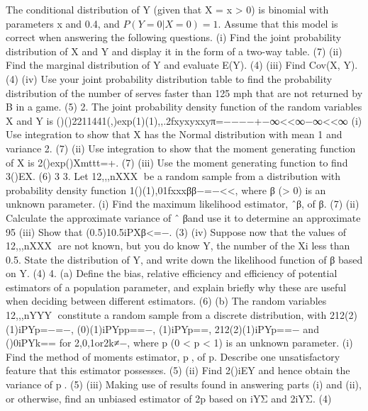 The conditional distribution of Y (given that X = x > 0) is binomial with parameters x and 0.4, and $P(Y = 0 | X = 0) = 1$. 
Assume that this model is correct when answering the following questions. (i) Find the joint probability distribution of X and Y and display it in the form of a two-way table. (7) (ii) Find the marginal distribution of Y and evaluate E(Y). (4) (iii) Find Cov(X, Y). (4) (iv) Use your joint probability distribution table to find the probability distribution of the number of serves faster than 125 mph that are not returned by B in a game. (5) 2. The joint probability density function of the random variables X and Y is ()()2211441(,)exp(1)(1),,.2fxyxyxxyπ=−−−−+−∞<<∞−∞<<∞ (i) Use integration to show that X has the Normal distribution with mean 1 and variance 2. (7) (ii) Use integration to show that the moment generating function of X is 2()exp()Xmttt=+. (7) (iii) Use the moment generating function to find 3()EX. (6)
3
3. Let 12,,,nXXX be a random sample from a distribution with probability density function 1()(1),01fxxxββ−=−<<, where β (> 0) is an unknown parameter. (i) Find the maximum likelihood estimator, ˆβ, of β. (7) (ii) Calculate the approximate variance of ˆ
βand use it to determine an approximate 95%
(iii) Show that (0.5)10.5iPXβ<=−. (3) (iv) Suppose now that the values of 12,,,nXXX are not known, but you do know Y, the number of the Xi less than 0.5. State the distribution of Y, and write down the likelihood function of β based on Y. (4) 4. (a) Define the bias, relative efficiency and efficiency of potential estimators of a population parameter, and explain briefly why these are useful when deciding between different estimators. (6) (b) The random variables 12,,,nYYY constitute a random sample from a discrete distribution, with 212(2)(1)iPYp=−=−, (0)(1)iPYpp==−, (1)iPYp==, 212(2)(1)iPYp==− and ()0iPYk== for 2,0,1or2k≠−, where p (0 < p < 1) is an unknown parameter. (i) Find the method of moments estimator, p, of p. Describe one unsatisfactory feature that this estimator possesses. (5) (ii) Find 2()iEY and hence obtain the variance of p. (5) (iii) Making use of results found in answering parts (i) and (ii), or otherwise, find an unbiased estimator of 2p based on iYΣ and 2iYΣ. 
(4)
